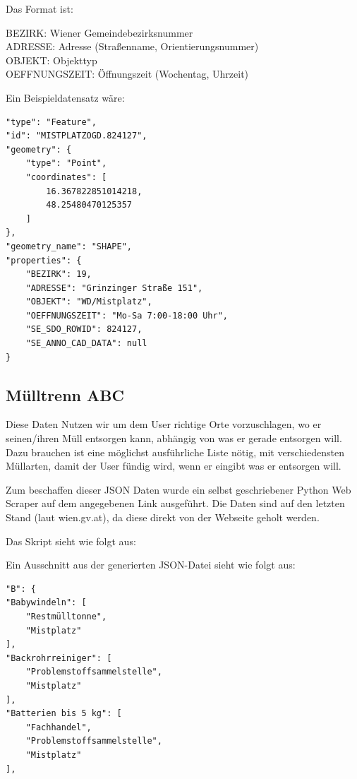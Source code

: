 \documentclass[12pt, a4paper]{scrreprt}
\begin{document}
    Das Format ist:
    \begin{tcolorbox}
        BEZIRK: Wiener Gemeindebezirksnummer\\
        ADRESSE: Adresse (Straßenname, Orientierungsnummer)\\
        OBJEKT: Objekttyp\\
        OEFFNUNGSZEIT: Öffnungszeit (Wochentag, Uhrzeit)
    \end{tcolorbox}
    
    Ein Beispieldatensatz wäre:
    \begin{lstlisting}
"type": "Feature",
"id": "MISTPLATZOGD.824127",
"geometry": {
    "type": "Point",
    "coordinates": [
        16.367822851014218,
        48.25480470125357
    ]
},
"geometry_name": "SHAPE",
"properties": {
    "BEZIRK": 19,
    "ADRESSE": "Grinzinger Straße 151",
    "OBJEKT": "WD/Mistplatz",
    "OEFFNUNGSZEIT": "Mo-Sa 7:00-18:00 Uhr",
    "SE_SDO_ROWID": 824127,
    "SE_ANNO_CAD_DATA": null
}
    \end{lstlisting}
\subsection{Mülltrenn ABC \cite{muelltrennabc}}
Diese Daten Nutzen wir um dem User richtige Orte vorzuschlagen, wo er seinen/ihren Müll entsorgen kann, abhängig von was er gerade entsorgen will. Dazu brauchen ist eine möglichst ausführliche Liste nötig, mit verschiedensten Müllarten, damit der User fündig wird, wenn er eingibt was er entsorgen will.

Zum beschaffen dieser JSON Daten wurde ein selbst geschriebener Python Web Scraper auf dem angegebenen Link ausgeführt. Die Daten sind auf den letzten Stand (laut wien.gv.at), da diese direkt von der Webseite geholt werden.

Das Skript sieht wie folgt aus:



Ein Ausschnitt aus der generierten JSON-Datei sieht wie folgt aus:

\begin{lstlisting}
"B": {
"Babywindeln": [
    "Restmülltonne",
    "Mistplatz"
],
"Backrohrreiniger": [
    "Problemstoffsammelstelle",
    "Mistplatz"
],
"Batterien bis 5 kg": [
    "Fachhandel",
    "Problemstoffsammelstelle",
    "Mistplatz"
], 
\end{lstlisting}
\end{document}
